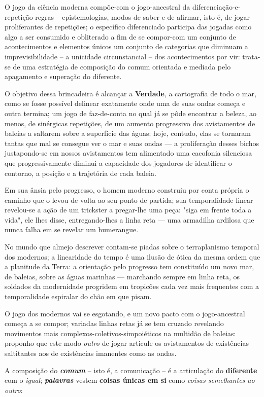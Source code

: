 O jogo da ciência moderna compõe-com o jogo-ancestral da diferenciação-e-repetição regras -- epistemologias, modos de saber e de afirmar, isto é, de jogar -- proliferantes de repetições;
    o específico diferenciado participa das jogadas como algo a ser consumido e obliterado a fim de se compor-com um conjunto de acontecimentos e elementos únicos um conjunto de categorias que diminuam a imprevisibilidade -- a unicidade circunstancial -- dos acontecimentos por vir:
        trata-se de uma estratégia de composição do comum orientada e mediada pelo apagamento e superação do diferente.

O objetivo dessa brincadeira é alcançar a \textbf{Verdade}, a cartografia de todo o mar, como se fosse possível delinear exatamente onde uma de suas ondas começa e outra termina;
    um jogo de faz-de-conta no qual já se pôde encontrar a beleza, ao menos, de sinérgicas repetições, de um aumento progressivo dos avistamentos de baleias a saltarem sobre a superfície das águas:
        hoje, contudo, elas se tornaram tantas que mal se consegue ver o mar e suas ondas --- a proliferação desses bichos justapondo-se em nossos avistamentos tem alimentado uma cacofonia silenciosa que progressivamente diminui a capacidade dos jogadores de identificar o contorno, a posição e a trajetória de cada baleia.

Em sua ânsia pelo progresso, o homem moderno construiu por conta própria o caminho que o levou de volta ao seu ponto de partida;
    sua temporalidade linear revelou-se a ação de um trickster a pregar-lhe uma peça:
        "siga em frente toda a vida", ele lhes disse, entregando-lhes a linha reta --- uma armadilha ardilosa que nunca falha em se revelar um bumerangue.

No mundo que almejo descrever contam-se piadas sobre o terraplanismo temporal dos modernos;
    a linearidade do tempo é uma ilusão de ótica da mesma ordem que a planitude da Terra:
        a orientação pelo progresso tem constituído um novo mar, de baleias, sobre as águas marinhas --- marchando sempre em linha reta, os soldados da modernidade progridem em tropicões cada vez mais frequentes com a temporalidade espiralar do chão em que pisam.

O jogo dos modernos vai se esgotando, e um novo pacto com o jogo-ancestral começa a se compor;
    variadas linhas retas já se tem cruzado revelando movimentos mais complexos-coletivos-simpoiéticos na multidão de baleias:
        proponho que este modo \textit{outro} de jogar articule os avistamentos de existências saltitantes aos de existências imanentes como as ondas.

A composição do \textbf{\textit{comum}} -- isto é, a comunicação -- é a articulação do \textbf{diferente} com o \textit{igual};
    \textbf{\textit{palavras}} vestem \textbf{coisas únicas em si} como \textit{coisas semelhantes ao outro}:



